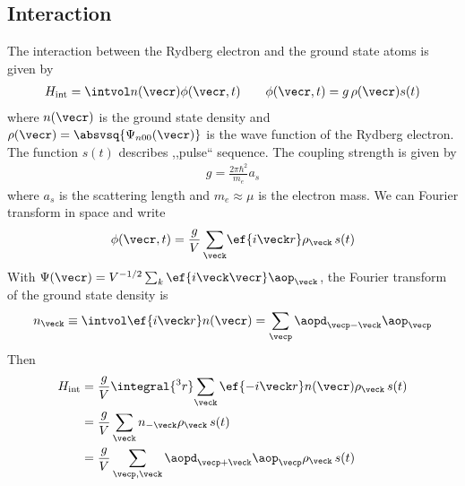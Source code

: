\subsection{Interaction}
The interaction between the Rydberg electron and the ground state atoms is given by
\begin{align}
H_\text{int} = \intvol n(\vecr) \phi(\vecr,t)\qquad \phi(\vecr,t) = g\, \rho(\vecr) s(t)
\end{align}
where $n(\vecr)$ is the ground state density and $\rho(\vecr)=\absvsq{\Psi_{n00}(\vecr)}$ is the wave function of the Rydberg electron. The function $s(t)$ describes ,,pulse`` sequence. The coupling strength is given by
\begin{align}
g = \frac{2\pi\hbar^2}{m_e} a_s
\end{align}
where $a_s$ is the scattering length and $m_e\approx\mu$ is the electron mass. We can Fourier transform in space and write
\begin{align}
\phi(\vecr,t) = \frac{g}{V} \sum_{\veck} \! \ef{i\veck r} \rho_{\veck} \, s(t)
\end{align}
With $\Psi(\vecr) = V^{-1/2} \sum_k \ef{i\veck \vecr}\aop_{\veck}$, the Fourier transform of the ground state density is
\begin{align}
n_{\veck}\equiv\intvol \ef{i\veck r} n(\vecr)  = \sum_{\vecp} \aopd_{\vecp-\veck} \aop_{\vecp}
\end{align}
Then
\begin{align}
H_\text{int} &= \frac{g}{V} \integral{^3r} \! \sum_{\veck} \ef{-i\veck r}  n(\vecr)  \rho_{\veck} \,s(t)\\
&= \frac{g}{V} \sum_{\veck}   n_{-\veck} \rho_{\veck}\, s(t)\\
&= \frac{g}{V} \sum_{\vecp,\veck} \aopd_{\vecp+\veck} \aop_{\vecp} \rho_{\veck}\, s(t)
\end{align}

